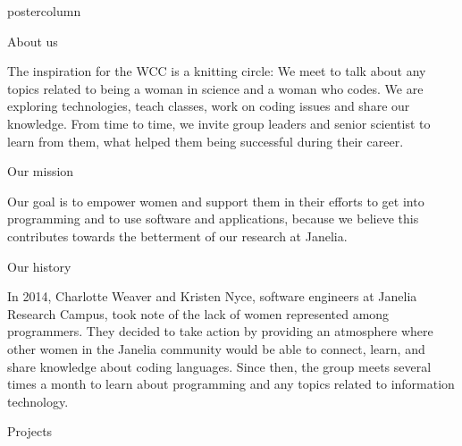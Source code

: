 \documentclass{beamer}
\begin{document}
\begin{frame}
\begin{columns}
\begin{column}{.33\textwidth}
\begin{beamercolorbox}[center,wd=\textwidth]{postercolumn}
\begin{minipage}[T]{.95\textwidth}
{\begin{myblock}{About us}
                        \begin{addmargin}[1em]{1em}
                            The inspiration for the WCC is a knitting circle: We meet to talk about any topics related to being a woman in science and a woman who codes.
                            We are exploring technologies, teach classes, work on coding issues and share our knowledge.\newline
                            From time to time, we invite group leaders and senior scientist to learn from them, what helped them being successful during their career.
                        \end{addmargin}
                    \end{myblock}
                    \vspace{1.25cm}
                    \begin{myblock}{Our mission}
                        \begin{addmargin}[1em]{1em}
                            Our goal is to empower women and support them in
their efforts to get into programming and to use software and applications, because we believe this contributes
                            towards the betterment of our research at Janelia.
                        \end{addmargin}
                    \end{myblock}
                    \vspace{1.25cm}
                    \begin{myblock}{Our history}
                        \begin{addmargin}[1em]{1em}
                            In 2014, Charlotte Weaver and Kristen Nyce, software engineers at Janelia Research Campus, took note of the lack of women represented among programmers. They decided to take action by providing an atmosphere where other women in the Janelia community would be able to connect, learn, and share knowledge about coding languages.\newline
                            Since then, the group meets several times a month to learn about programming and any topics related to information technology.
                        \end{addmargin}
                    \end{myblock}
                    \vspace{1.25cm}
                    \begin{myblock}{Projects}
                        \begin{addmargin}[1em]{1em}

\end{addmargin}
\end{myblock}}
\end{minipage}
\end{beamercolorbox}
\end{column}
\end{columns}
\end{frame}
\end{document}
